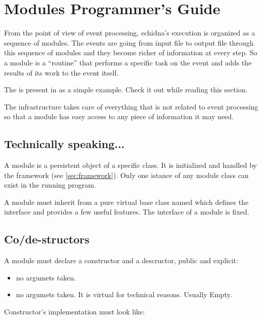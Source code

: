 \section{Modules Programmer's Guide}
\label{sec:modules}

From the point of view of event processing, echidna's execution is organized as a sequence of modules.
The events are going from input file to output file through this sequence of modules and they become richer of information at every step.
So a module is a ``routine'' that performs a specific task on the event and adds the results of its work to the event itself.

The  is present in  as a simple example. Check it out while reading this section.

The infrastructure takes care of everything that is not related to event processing
so that a module has easy access to any piece of information it may need.


\subsection{Technically speaking...}

A module is a persistent object of a specific class.
It is initialized and handled by the framework (see \ref{sec:framework}).
Only one istance of any module class can exist in the running program.

A module must inherit from a pure virtual base class named  which defines the interface and provides a few useful features.
The interface of a module is fixed.


\subsection{Co/de-structors}

A module must declare a constructor and a descructor, public and explicit:
\begin{itemize}
\item {}

no argumets taken.

\item {}

no argumets taken. It is virtual for technical reasons. Usually Empty.

\end{itemize}
Constructor's implementation must look like:

